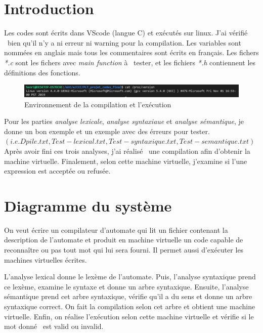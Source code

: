 \documentclass[a4paper,14pt,UTF8]{article}
\begin{document}
	
	\newpage
	\begin{center}
		\tableofcontents
	\end{center}
	\clearpage
	
	\section{Introduction}
	\quad Les codes sont écrits dans VScode (langue C) et exécutés sur linux. J'ai vérifié \ bien qu'il n'y a ni erreur ni warning pour la compilation.
	Les variables sont nommées en anglais mais tous les commentaires sont écrits en français.	Les fichers \textit{*.c} sont les fichers avec \textit{main function} à \ tester, et les fichiers \textit{*.h} contiennent les définitions des fonctions. 
	
	\begin{figure}[h]
		\setlength{\abovecaptionskip}{-0.cm}
		
		\begin{center}
			\includegraphics[width=17cm]{1_env}
		\end{center}
		\caption{Environnement de la compilation et l'exécution}
	\end{figure}
	
	\quad Pour les parties \textit{analyse lexicale}, \textit{analyse syntaxiaue} et \textit{analyse sémantique}, je donne un bon exemple et un exemple avec des érreurs pour tester. $(i.e. Dpile.txt, Test- lexical.txt, Test-syntaxique.txt, Test-semantique.txt)$ Après avoir fini ces trois analyses, j'ai réalisé \ une compilation afin d'obtenir la machine virtuelle. Finalement, selon cette machine virtuelle, j'examine si l'une expression est acceptée ou refusée.
	
	
	
	\section{Diagramme du système}
	\quad On veut écrire un compilateur d'automate qui lit un fichier contenant la description de l'automate et produit en machine virtuelle un code capable de reconnaître ou pas tout mot qui lui sera fourni. Il permet aussi
	d'exécuter les machines virtuelles écrites. 
	
	\quad L'analyse lexical donne le lexème de l'automate. Puis, l'analyse syntaxique prend ce lexème, examine le syntaxe et donne un arbre syntaxique. Ensuite, l'analyse sémantique prend cet arbre syntaxique, vérifie qu'il a du sens et donne un arbre syntaxique correct. On fait la compilation selon cet arbre et obtient une machine virtuelle. Enfin, on réalise l'exécution selon cette machine virtuelle et vérifie si le mot donné \ est valid ou invalid.
	
\end{document}
